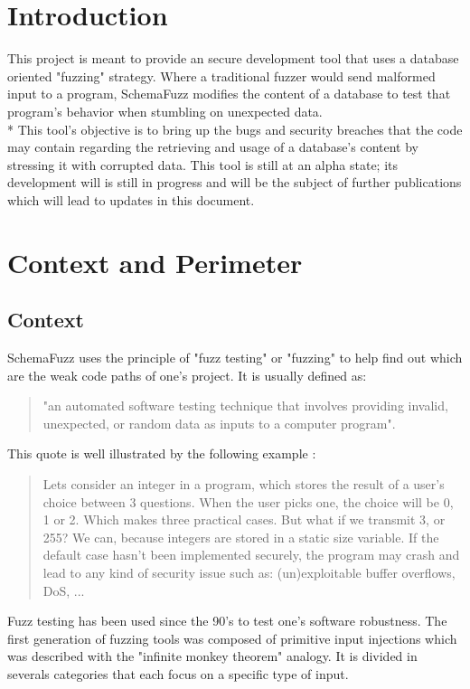 \documentclass{article}
\begin{document}
\begin{empfile}
	
	\section{Introduction} 
	
This project is meant to provide an secure development tool that uses a database oriented "fuzzing" strategy.  
Where a traditional fuzzer would send malformed input to a program, SchemaFuzz modifies the content of a database to test that program's behavior when stumbling on  unexpected data. \\*
This tool's objective is to bring up the bugs and security breaches that the code may contain regarding the retrieving and usage  of a database's content by stressing it with corrupted data.
This tool is still at an alpha state; its development will is still in progress and will be the subject of further publications which will lead to updates in this document. 
	\clearpage

	
	\section{Context and Perimeter}
		\subsection{Context}

SchemaFuzz uses the principle of "fuzz testing" or "fuzzing" to help find out which are the weak code paths of one's project. It is usually defined as: 

\begin{quotation} "an automated software testing technique that involves providing invalid, unexpected, or random data as inputs to a computer program". \end{quotation}\cite{fuzzing}		
	
This quote is well illustrated by the following example :
				\begin{quotation}
Lets consider an integer in a program, which stores the result of a user's choice between 3 questions. When the user picks one, the choice will be 0, 1 or 2. Which makes three practical cases. But what if we transmit 3, or 255? We can, because integers are stored in a static size variable. If the default case hasn't been implemented securely, the program may crash and lead to any kind of security issue such as: (un)exploitable buffer overflows, DoS, ... 
				\end{quotation}

Fuzz testing has been used since the 90's to test one's software robustness.
The first generation of fuzzing tools was composed of primitive input injections which was described with the "infinite monkey theorem" analogy.
It is divided in severals categories that each focus on a specific type of input.
 

\end{empfile}
\end{document}
